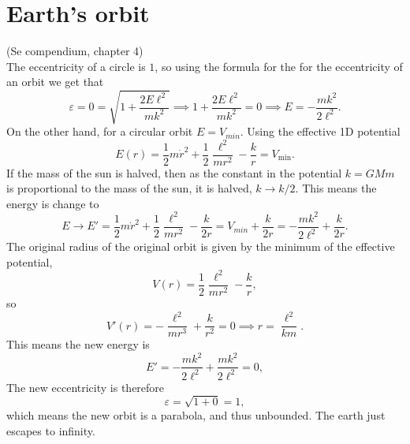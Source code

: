 \documentclass{article}
\begin{document}
    \section{Earth's orbit}
        (Se compendium, chapter 4) \\
        The eccentricity of a circle is $1$, so using the formula for the for the eccentricity of an orbit we get that
        \begin{equation*}
            \varepsilon = 0 = \sqrt{1 + \frac{2 E \ell^2}{m k^2}} \implies 1 + \frac{2 E \ell^2}{m k^2} = 0 \implies E = - \frac{m k^2}{2 \ell^2}.
        \end{equation*}
        On the other hand, for a circular orbit $E = V_{min}$. Using the effective 1D potential 
        \begin{equation*}
            E(r) = \frac{1}{2}m \dot r^2 + \frac{1}{2} \frac{\ell^2}{m r^2} - \frac{k}{r} = V_\mathrm{min}.
        \end{equation*}
        If the mass of the sun is halved, then as the constant in the potential $k = GMm$ is proportional to the mass of the sun, it is halved, $k \rightarrow k/2$. This means the energy is change to
        \begin{equation*}
            E \rightarrow E' = \frac{1}{2}m \dot r^2 + \frac{1}{2} \frac{\ell^2}{m r^2} - \frac{k}{2r} = V_{min} + \frac{k}{2r} = - \frac{m k^2}{2 \ell^2} + \frac{k}{2 r}.
        \end{equation*}
        The original radius of the original orbit is given by the minimum of the effective potential,
        \begin{equation*}
            V(r) =  \frac{1}{2} \frac{\ell^2}{m r^2} - \frac{k}{r},
        \end{equation*}
        so
        \begin{equation*}
            V'(r) = -\frac{\ell^2}{m r^3} + \frac{k}{r^2} = 0 \implies r = \frac{\ell^2}{k m}.
        \end{equation*}
        This means the new energy is 
        \begin{equation*}
            E' = -\frac{m k^2 }{2 \ell^2} + \frac{mk^2}{2 \ell^2} = 0,
        \end{equation*}
        The new eccentricity is therefore 
        \begin{equation*}
            \varepsilon = \sqrt{1 + 0} = 1,
        \end{equation*}
        which means the new orbit is a parabola, and thus unbounded. The earth just escapes to infinity.
\end{document}
